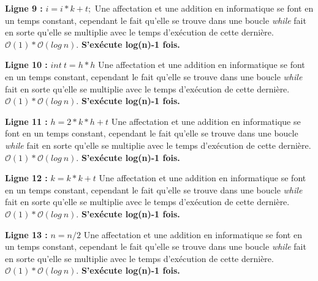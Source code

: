 \documentclass[12pt]{article}
\begin{document}
        \noindent \textbf{Ligne 9 :} \( i = i*k + t; \) \newline
  	    Une affectation et une addition en informatique se font en un temps constant, cependant le fait qu'elle se trouve dans une boucle \textit{while} fait en sorte qu'elle se multiplie avec le temps d'exécution de cette dernière.
        \( \mathcal{O}(1)*\mathcal{O}(log \: n) \). \newline
		\textbf{S'exécute log(n)-1 fois.} \newline

        \noindent \textbf{Ligne 10 :} \( int \: t = h*h \) \newline
  	    Une affectation et une addition en informatique se font en un temps constant, cependant le fait qu'elle se trouve dans une boucle \textit{while} fait en sorte qu'elle se multiplie avec le temps d'exécution de cette dernière.
        \( \mathcal{O}(1)*\mathcal{O}(log \: n) \). \newline
        \textbf{S'exécute log(n)-1 fois.} \newline

        \noindent \textbf{Ligne 11 :} \( h = 2*k*h + t \) \newline
  	    Une affectation et une addition en informatique se font en un temps constant, cependant le fait qu'elle se trouve dans une boucle \textit{while} fait en sorte qu'elle se multiplie avec le temps d'exécution de cette dernière.
        \( \mathcal{O}(1)*\mathcal{O}(log \: n) \). \newline
        \textbf{S'exécute log(n)-1 fois.} \newline

        \noindent \textbf{Ligne 12 :} \( k = k*k + t \) \newline
  	    Une affectation et une addition en informatique se font en un temps constant, cependant le fait qu'elle se trouve dans une boucle \textit{while} fait en sorte qu'elle se multiplie avec le temps d'exécution de cette dernière.
        \( \mathcal{O}(1)*\mathcal{O}(log \: n) \). \newline
        \textbf{S'exécute log(n)-1 fois.} \newline

        \noindent \textbf{Ligne 13 :} \( n = n/2 \) \newline
  	    Une affectation et une addition en informatique se font en un temps constant, cependant le fait qu'elle se trouve dans une boucle \textit{while} fait en sorte qu'elle se multiplie avec le temps d'exécution de cette dernière.
        \( \mathcal{O}(1)*\mathcal{O}(log \: n) \). \newline
        \textbf{S'exécute log(n)-1 fois.} \newline
\end{document}

